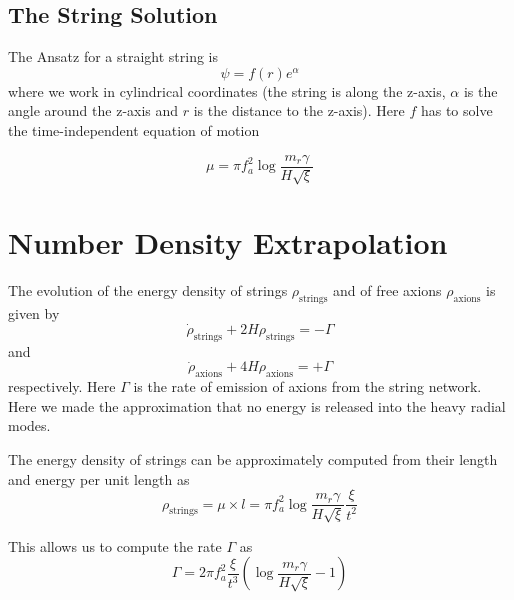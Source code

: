 \documentclass[a4paper]{article}
\begin{document}
\subsection{The String Solution}

The Ansatz for a straight string is
\begin{equation}
	\psi = f(r) e^{\alpha}
\end{equation}
where we work in cylindrical coordinates (the string is along the z-axis, $\alpha$ is the angle around the z-axis and $r$ is the distance to the z-axis).
Here $f$ has to solve the time-independent equation of motion


\begin{equation}
	\mu = \pi f_a^2 \log \frac{m_r \gamma}{H \sqrt{\xi}}
\end{equation}

\newpage
\section{Number Density Extrapolation}

The evolution of the energy density of strings $\rho_\mathrm{strings}$
and of free axions $\rho_\mathrm{axions}$ is given by
\begin{equation}
	\label{eq:string_energy_eom}
	\dot{\rho}_\mathrm{strings} + 2 H \rho_\mathrm{strings} = - \Gamma
\end{equation}
and
\begin{equation}
	\label{eq:axion_energy_eom}
	\dot{\rho}_\mathrm{axions} + 4 H \rho_\mathrm{axions} = + \Gamma
\end{equation}
respectively.
Here $\Gamma$ is the rate of emission of axions from the string network.
Here we made the approximation that no energy is released into the heavy radial modes. 

The energy density of strings can be approximately computed from their length and energy per unit length as
\begin{equation}
	\rho_\mathrm{strings} = \mu \times l = \pi f_a^2 \log \frac{m_r \gamma}{H \sqrt{\xi}} \frac{\xi}{t^2}
\end{equation}

This allows us to compute the rate $\Gamma$ as 
\begin{equation}
	\Gamma = 2 \pi f_a^2 \frac{\xi}{t^3} \left( \log \frac{m_r \gamma}{H \sqrt{\xi}} - 1  \right)
\end{equation}
\end{document}

